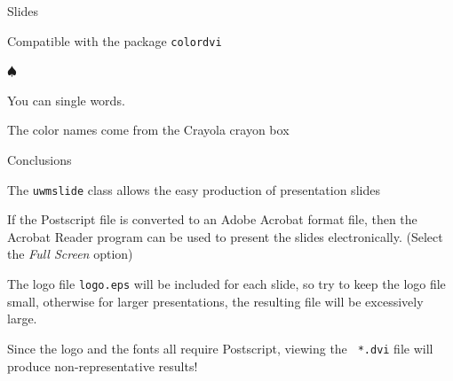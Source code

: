 \documentclass{uwmslide}
\begin{document}
\begin{itemslide}{  Slides}
\item Compatible with the package {\tt colordvi}
\item {}
\item [$\spadesuit$] 
\item You can  single words.
\item The color names come from the Crayola crayon box
\item[\Black{$\bullet$}]   
   
\end{itemslide}

\begin{itemslide}{Conclusions}
\item The {\tt uwmslide} class allows the easy production of presentation slides
\item If the Postscript file is converted to an Adobe Acrobat format file, then
the Acrobat Reader program can be used to present the slides electronically. 
(Select the {\em Full Screen} option)
\item The logo file {\tt logo.eps} will be included for each slide, so try to
keep the logo file small, otherwise for larger presentations, the resulting file
will be excessively large.
\item Since the logo and the fonts all require Postscript, viewing the {\tt
*.dvi} file will produce non-representative results!
\end{itemslide}
\end{document}
